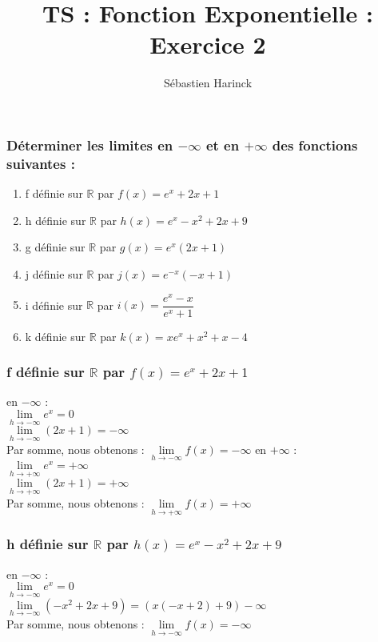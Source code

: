 \documentclass[t]{beamer}
\title{TS : Fonction Exponentielle : Exercice 2}
\author{Sébastien Harinck}
\institute{www.cours-futes.com}
\date{}
\begin{document}
\begin{frame}
\titlepage
\end{frame}

\begin{frame}
\frametitle{Déterminer les limites en $- \infty $ et en $+\infty$ des fonctions suivantes :}
\pause
\begin{enumerate}
\item<+-> f définie sur $\mathbb{R}$ par $ f(x) = e^x +2x+1$
\item<+-> h définie sur $\mathbb{R}$ par $ h(x) = e^x-x^2+2x+9$
\item<+-> g définie sur $\mathbb{R}$ par $ g(x) = e^x(2x+1)$
\item<+-> j définie sur $\mathbb{R}$ par $ j(x) = e^{-x}(-x+1)$
\item<+-> i définie sur $\mathbb{R}$ par $ i(x) = \dfrac{e^x-x}{e^x+1}$
\item<+-> k définie sur $\mathbb{R}$ par $ k(x) = xe^x+x^2+x-4$
\end{enumerate}
\end{frame}

\begin{frame}
\frametitle{f définie sur $\mathbb{R}$ par $ f(x) = e^x +2x+1$}
\pause
en $- \infty $ : \\
\( \lim\limits_{h \rightarrow -\infty} e^x = 0 \) \\
\( \lim\limits_{h \rightarrow -\infty} (2x+1) = -\infty \) \\
Par somme, nous obtenons : $ \lim\limits_{h \rightarrow -\infty}f(x)= -\infty$
en $+ \infty $ : \\
\( \lim\limits_{h \rightarrow +\infty} e^x = + \infty \) \\
\( \lim\limits_{h \rightarrow +\infty} (2x+1) = +\infty \) \\
Par somme, nous obtenons : $ \lim\limits_{h \rightarrow +\infty}f(x)= + \infty$
\end{frame}

\begin{frame}
\frametitle{h définie sur $\mathbb{R}$ par $ h(x) = e^x-x^2+2x+9$}
\pause
en $- \infty $ : \\
\( \lim\limits_{h \rightarrow -\infty} e^x = 0 \) \\
\( \lim\limits_{h \rightarrow -\infty} (-x^2+2x+9) = (x(-x+2) + 9) -\infty \) \\
Par somme, nous obtenons : $ \lim\limits_{h \rightarrow -\infty}f(x)= -\infty$
\end{frame}
\end{document}
